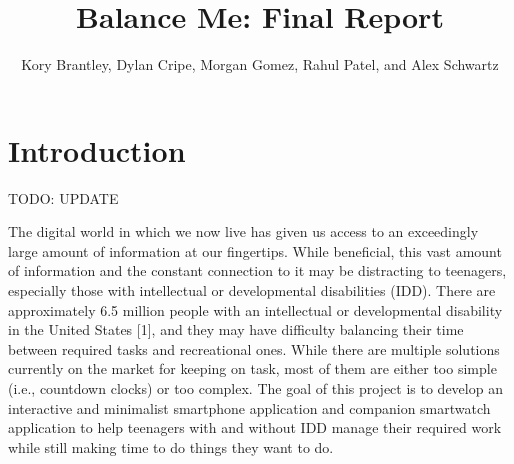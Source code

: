 \documentclass{sigchi}
\def\plaintitle{Balance Me: Final Report}
\def\plainauthor{Kory Brantley, Dylan Cripe, Morgan Gomez, Rahul Patel,
and Alex Schwartz}
\begin{document}
\title{\plaintitle}

\author{
\plainauthor
}

\newenvironment{myitemize}
{ \begin{itemize}
    \setlength{\itemsep}{0pt}
    \setlength{\parskip}{0pt}
    \setlength{\parsep}{0pt}     }
{ \end{itemize}                  } 

\maketitle

\section{Introduction}

\large{TODO: UPDATE}

The digital world in which we now live has given us access to an exceedingly
large amount of information at our fingertips. While beneficial, this vast
amount of information and the constant connection to it may be distracting to
teenagers, especially those with intellectual or developmental disabilities
(IDD). There are approximately 6.5 million people with an intellectual or
developmental disability in the United States [1], and they may have difficulty
balancing their time between required tasks and recreational ones. While there
are multiple solutions currently on the market for keeping on task, most of
them are either too simple (i.e., countdown clocks) or too complex. The goal of
this project is to develop an interactive and minimalist smartphone application
and companion smartwatch application to help teenagers with and without IDD
manage their required work while still making time to do things they want to do.
\end{document}
